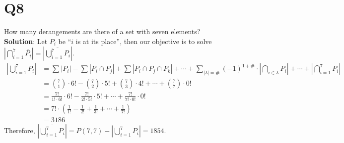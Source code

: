 \documentclass[a4paper,11pt]{article}
\newenvironment{solution}{{\\\bf Solution}:}{\smallskip}
\begin{document}
\section*{Q8}
How many derangements are there of a set with seven elements?
\begin{solution}
    Let $P_{i }$ be ``$i$ is at its place'', then our objective is to solve $\left\vert \bigcap_{i=1}^{7}\overline{P_{i}} \right\vert 
    =\left\vert \overline{\bigcup_{i=1}^{7}P_{i} } \right\vert $.
    \begin{align*}
        \left\vert \bigcup_{i=1}^{7}P_{i} \right\vert
        &=\sum\left\vert P_{i } \right\vert -\sum\left\vert P_{i}\cap P_{j} \right\vert +\sum \left\vert P_{i }\cap P_{j } \cap P_{k } \right\vert
        + \cdots +\sum_{\left\vert \lambda  \right\vert=\# }(-1)^{1+\#} \cdot \left\vert \bigcap_{i \in \lambda}P_{i } \right\vert + \cdots +
        \left\vert \bigcap_{i=1 }^{7}P_{i} \right\vert \\
        &=\binom{7}{1}\cdot 6!-\binom{7}{2}\cdot 5!+\binom{7}{3}\cdot 4!
            + \cdots +\binom{7}{7}\cdot 0!\\
        &=\frac{7!}{1!\cdot 6!}\cdot 6!-\frac{7!}{2!\cdot 5!}\cdot 5!
            + \cdots +\frac{7!}{7!\cdot 0!}\cdot 0!\\
        &=7!\cdot (\frac{1}{1!}-\frac{1}{2!}+\frac{1}{3!}+ \cdots +\frac{1}{7!})\\
        &=3186
    \end{align*}
    Therefore, $\left\vert \overline{\bigcup_{i=1}^{7}P_{i}} \right\vert 
    =P(7,7)-\left\vert \bigcup_{i=1}^{7}P_{i} \right\vert=1854$.
\end{solution}
\end{document}
